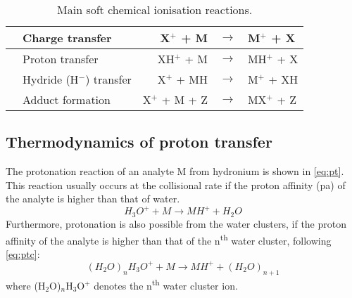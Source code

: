 \begin{table}[ht]
\centering
\caption{Main soft chemical ionisation reactions.}
\label{tb:ge}
\begin{tabular}{ll rcl}
\toprule
\qquad& Charge transfer \quad & X$^+$ + M&$\rightarrow$&M$^+$ + X \qquad\\ \midrule
&Proton transfer \quad & XH$^+$ + M&$\rightarrow$&MH$^+$ + X\\ \midrule
&Hydride (H$^-$) transfer \quad & X$^+$ + MH&$\rightarrow$&M$^+$ + XH\\ \midrule
&Adduct formation \quad & X$^+$ + M + Z&$\rightarrow$&MX$^+$ + Z\\
\bottomrule
\end{tabular}
\end{table}





\subsection{Thermodynamics of proton transfer}
The protonation reaction of an analyte M from hydronium is shown in  \autoref{eq:pt}.
This reaction usually occurs at the collisional rate if the proton affinity (\acrshort{pa}) of the analyte is higher than that of water.
\begin{equation}
\label{eq:pt}
H_3O^+ + M \rightarrow MH^+ + H_2O
\end{equation}
Furthermore, protonation is also possible from the water clusters, if the proton affinity of the analyte is higher than that of the n\textsuperscript{th} water cluster, following \autoref{eq:ptc}:
\begin{equation}
\label{eq:ptc}
(H_2O)_{n}H_3O^+ + M  \rightarrow MH^+ + (H_2O)_{n+1}
\end{equation}
where (H$_2$O)$_{n}$H$_3$O$^+$ denotes the n\textsuperscript{th} water cluster ion.

